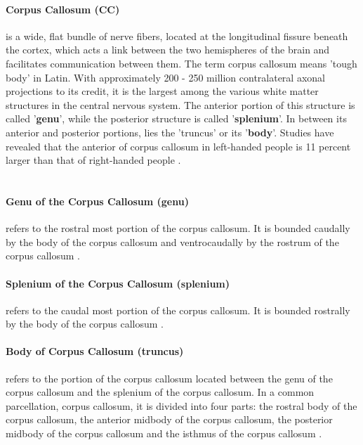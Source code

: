 \documentclass[../structure.tex]{subfiles}
\begin{document}
		\paragraph{Corpus Callosum (CC)} is a wide, flat bundle of nerve fibers, located at the longitudinal fissure beneath the cortex, which acts a link between the two hemispheres of the brain and facilitates communication between them. The term corpus callosum means 'tough body' in Latin. With approximately 200 - 250 million contralateral axonal projections to its credit, it is the largest among the various white matter structures in the central nervous system.
The anterior portion of this structure is called '\textbf{genu}', while the posterior structure is called '\textbf{splenium}'. In between its anterior and posterior portions, lies the 'truncus' or its '\textbf{body}'. Studies have revealed that the anterior of corpus callosum in left-handed people is 11 percent larger than that of right-handed people \cite{PDD2015}.\\\
		\paragraph{Genu of the Corpus Callosum (genu)}
		 refers to the rostral most portion of the corpus callosum. It is bounded caudally by the body of the corpus callosum and ventrocaudally by the rostrum of the corpus callosum \cite{Washington1994}.\\
		\paragraph{Splenium of the Corpus Callosum (splenium)}
		 refers to the caudal most portion of the corpus callosum. It is bounded rostrally by the body of the corpus callosum \cite{Washington1994}.\\
\paragraph{Body of Corpus Callosum (truncus)} 
		 refers to the portion of the corpus callosum located between the genu of the corpus callosum and the splenium of the corpus callosum. In a common parcellation, corpus callosum, it is divided into four parts: the rostral body of the corpus callosum, the anterior midbody of the corpus callosum, the posterior midbody of the corpus callosum and the isthmus of the corpus callosum \cite{Washington1994}.
\end{document}

